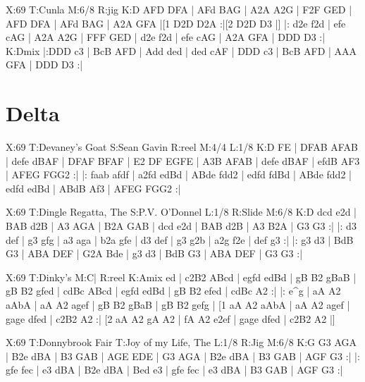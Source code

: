 \documentclass[letterpaper]{article}
\begin{document}
\begin{abc}[name]
X:69
T:Cunla
M:6/8
R:jig
K:D
AFD DFA | AFd BAG | A2A A2G | F2F GED |
AFD DFA | AFd BAG | A2A GFA |[1 D2D D2A :|[2 D2D D3 |]
|: d2e f2d | efe cAG | A2A A2G | FFF GED |
d2e f2d | efe cAG | A2A GFA | DDD D3 :|
K:Dmix
|:DDD c3 | BcB AFD | Add ded | ded cAF |
DDD c3 | BcB AFD | AAA GFA | DDD D3 :|
\end{abc}

\section{Delta}

\begin{abc}[name]
X:69
T:Devaney's Goat
S:Sean Gavin
R:reel
M:4/4
L:1/8
K:D
FE | DFAB AFAB | defe dBAF | DFAF BFAF | E2 DF EGFE |
A3B AFAB | defe dBAF | efdB AF3 | AFEG FGG2 :|
|: faab afdf | a2fd edBd | ABde fdd2 | edfd fdBd |
ABde fdd2 | edfd edBd | ABdB Af3 | AFEG FGG2 :|
\end{abc}

\begin{abc}[name]
X:69
T:Dingle Regatta, The
S:P.V. O'Donnel
L:1/8
R:Slide
M:6/8
K:D
dcd e2d | BAB d2B | A3 AGA | B2A GAB |
dcd e2d | BAB d2B | A3 B2A | G3 G3 :|
|: d3 def | g3 gfg | a3 aga | b2a gfe |
d3 def | g3 g2b | a2g f2e | def g3 :|
|: g3 d3 | BdB G3 | ABA DEF | G2A Bde |
g3 d3 | BdB G3 | ABA DEF | G3 G3 :|
\end{abc}

\begin{abc}[name]
X:69
T:Dinky's
M:C|
R:reel
K:Amix
ed | c2B2 ABcd | egfd edBd | gB B2 gBaB | gB B2 gfed |
cdBc ABcd | egfd edBd | gB B2 efed | cdBc A2 :|
|: e^g | aA A2 aAbA | aA A2 agef | gB B2 gBaB | gB B2 gefg |
[1 aA A2 aAbA | aA A2 agef | gage dfed | c2B2 A2 :|
[2 aA A2 gA A2 | fA A2 e2ef | gage dfed | c2B2 A2 |]
\end{abc}

\begin{abc}[name]
X:69
T:Donnybrook Fair
T:Joy of my Life, The
L:1/8
R:Jig
M:6/8
K:G
G3 AGA | B2e dBA | B3 GAB | AGE EDE |
G3 AGA | B2e dBA | B3 GAB | AGF G3 :|
|: gfe fec | e3 dBA | B2e dBA | Bed e3 |
gfe fec | e3 dBA | B3 GAB | AGF G3 :|
\end{abc}
\end{document}
